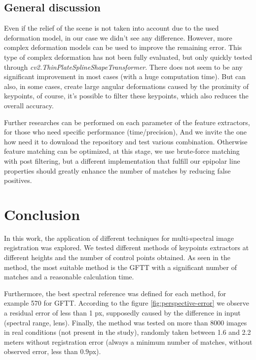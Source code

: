 \documentclass[]{elsarticle}
\begin{document}
	\subsection{General discussion}
	
	\par Even if the relief of the scene is not taken into account due to the used deformation model,
	in our case we didn't see any difference.
	However, more complex deformation models \cite{Lombaert, ThinPlateSpline} can be used to improve the remaining error.
	This type of complex deformation has not been fully evaluated, but only quickly tested through \textit{cv2.ThinPlateSplineShapeTransformer}.
	There does not seem to be any significant improvement in most cases (with a huge computation time).
	But can also, in some cases, create large angular deformations caused by the proximity of keypoints,
	of course, it's possible to filter these keypoints, which also reduces the overall accuracy.
	\\
	\par Further researches can be performed on each parameter of the feature extractors, for those who need specific performance (time/precision),
	And we invite the one how need it to download the repository and test various combination.
	Otherwise feature matching can be optimized, at this stage, we use brute-force matching with post filtering,
	but a different implementation that fulfill our epipolar line properties should greatly enhance the number of matches by reducing false positives.
	
	
	
	\section{Conclusion}
	
	In this work, the application of different techniques for multi-spectral image registration was explored.
	We tested different methods of keypoints extractors at different heights and the number of control points obtained.
	As seen in the method, the most suitable method is the GFTT with a significant number of matches and a reasonable calculation time.
	\\
	\par Furthermore, the best spectral reference was defined for each method, for example 570 for GFTT.
	According to the figure \ref{fig:perspective-error} we observe a residual error of less than 1 px,
	supposedly caused by the difference in input (spectral range, lens).
	Finally, the method was tested on more than 8000 images in real conditions (not present in the study),
	randomly taken between 1.6 and 2.2 meters without registration error (always a minimum number of matches, without observed error, less than $0.9$px).
	
\end{document}
